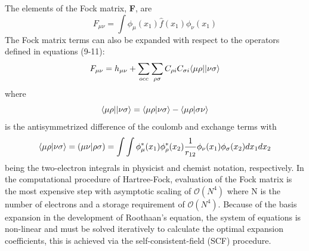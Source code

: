     The elements of the Fock matrix, \textbf{F}, are
      \begin{equation}
      F_{\mu\nu} = \int \phi_\mu(x_1) \hat{f}(x_1) \phi_\nu(x_1) 
      \end{equation}
    The Fock matrix terms can also be expanded with respect to the operators defined in equations (9-11):
      \begin{equation}
      F_{\mu\nu} = h_{\mu\nu} + \sum_{occ}\sum_{\rho \sigma} C_{\rho i} C_{\sigma i} \langle\mu \rho || \nu \sigma \rangle
      \end{equation}
    where 
      \begin{equation}
      \langle\mu \rho || \nu \sigma \rangle = \langle\mu \rho|\nu \sigma\rangle - \langle\mu \rho|\sigma \nu\rangle
      \end{equation}
    is the antisymmetrized difference of the coulomb and exchange terms with 
      \begin{equation}
      \langle\mu \rho|\nu \sigma\rangle = (\mu \nu | \rho \sigma) = \int \int \phi^*_\mu(x_1) \phi^*_\rho(x_2) \frac{1}{r_{12}} \phi_\nu (x_1) \phi_\sigma(x_2) dx_1 dx_2
      \end{equation}
    being the two-electron integrals in physicist and chemist notation, respectively. In the computational procedure of Hartree-Fock, evaluation of the Fock matrix is the most expensive step with asymptotic scaling of $\mathcal{O}(N^4)$ where N is the number of electrons and a storage requirement of $\mathcal{O}(N^4)$. Because of the basis expansion in the development of Roothaan's equation, the system of equations is non-linear and must be solved iteratively to calculate the optimal expansion coefficients, this is achieved via the self-consistent-field (SCF) procedure.


